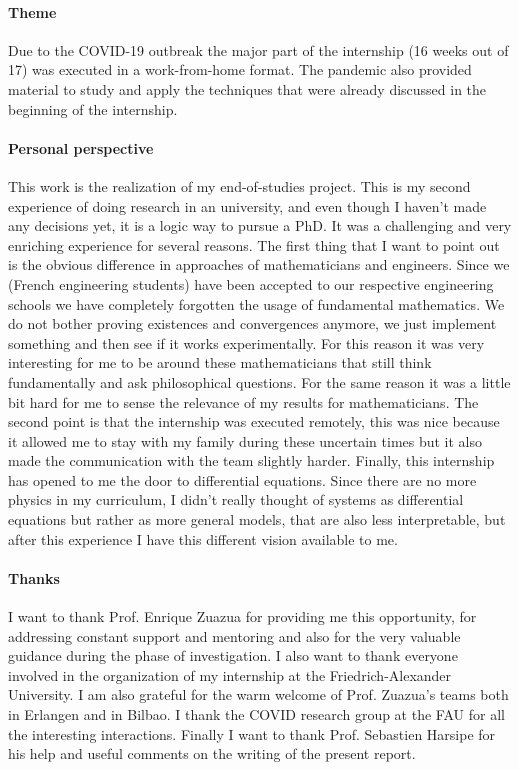 \documentclass[12pt, letterpaper]{article}
\begin{document}
\paragraph{Theme} Due to the COVID-19 outbreak the major part of the internship (16 weeks out of 17) was executed in a work-from-home format. 
The pandemic also provided material to study and apply the techniques that were already discussed in the beginning of the internship.
 
\paragraph{Personal perspective} This work is the realization of my end-of-studies project. 
This is my second experience of doing research in an university, and even though I haven’t made any decisions yet, it is a logic way to pursue a PhD. 
It was a challenging and very enriching experience for several reasons. 
The first thing that I want to point out is the obvious difference in approaches of mathematicians and engineers. Since we (French engineering students) have been accepted to our respective engineering schools we have completely forgotten the usage of fundamental mathematics. 
We do not bother proving existences and convergences anymore, we just implement something and then see if it works experimentally. 
For this reason it was very interesting for me to be around these mathematicians that still think fundamentally and ask philosophical questions. 
For the same reason it was a little bit hard for me to sense the relevance of my results for mathematicians.
The second point is that the internship was executed remotely, this was nice because it allowed me to stay with my family during these uncertain times but it also made the communication with the team slightly harder.
Finally, this internship has opened to me the door to differential equations. 
Since there are no more physics in my curriculum, I didn't really thought of systems as differential equations but rather as more general models, that are also less interpretable, but after this experience I have this different vision available to me.


\paragraph{Thanks} I want to thank Prof. Enrique Zuazua for providing me this opportunity, for addressing constant support and mentoring and also for the very valuable guidance during the phase of investigation. 
I also want to thank everyone involved in the organization of my internship at the Friedrich-Alexander University. 
I am also grateful for the warm welcome of Prof. Zuazua's teams both in Erlangen and in Bilbao. 
I thank the COVID research group at the FAU for all the interesting interactions. 
Finally I want to thank Prof. Sebastien Harsipe for his help and useful comments on the writing of the present report.
\end{document}
